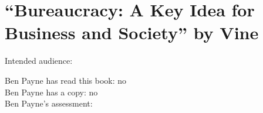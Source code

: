 \section{``Bureaucracy: A Key Idea for Business and Society'' by Vine\label{review:vine_key}}

\cite{2020_Vine}

Intended audience:

Ben Payne has read this book: no\\
Ben Payne has a copy: no\\
Ben Payne's assessment:
